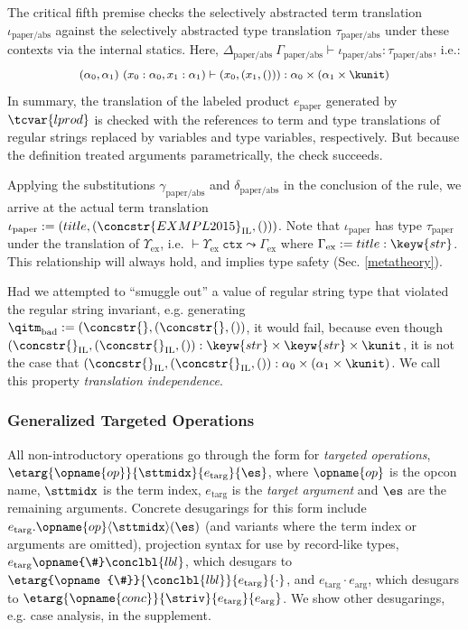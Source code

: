 The critical fifth premise checks the selectively abstracted term translation $\iota_\text{paper/abs}$ against the selectively abstracted type translation $\tau_\text{paper/abs}$ under these contexts via the internal statics. Here, $\Delta_\text{paper/abs}~\Gamma_\text{paper/abs} \vdash \iota_\text{paper/abs} : \tau_\text{paper/abs}$, i.e.: 
\[\small\begin{array}{l}(\alpha_0, \alpha_1)~(x_0 : \alpha_0, x_1 : \alpha_1) \vdash (x_0, (x_1, ())) : \alpha_0 \times (\alpha_1 \times \kunit)\end{array}\]
In summary, the translation of the labeled product $e_\text{paper}$ generated by $\tcvar{lprod}$ is checked with the references to term and type translations of regular strings replaced by variables and type variables, respectively. But because the  definition treated arguments parametrically, the check succeeds. %

Applying the substitutions $\gamma_\text{paper/abs}$ and $\delta_\text{paper/abs}$ in the conclusion of the rule, we arrive at the actual term translation $\iota_\text{paper} := (title, (\concstr{EXMPL 2015}_\text{IL}, ()))$. Note that $\iota_\text{paper}$ has type $\tau_\text{paper}$ under the translation of $\Upsilon_\text{ex}$, i.e. $\vdash \Upsilon_\text{ex}~\mathtt{ctx} \leadsto \Gamma_\text{ex}$ where $\Gamma_\text{ex} := title : \keyw{str}$. This relationship will always hold, and implies type safety (Sec. \ref{metatheory}). 

Had we attempted to ``smuggle out'' a value of regular string type that violated the regular string invariant, e.g. generating $\qitm_\text{bad} := (\concstr{}, (\concstr{}, ())$, it would fail, because even though $(\concstr{}_\text{IL}, (\concstr{}_\text{IL}, ()) : \keyw{str} \times \keyw{str} \times \kunit$, it is not the case that $(\concstr{}_\text{IL}, (\concstr{}_\text{IL}, ()) : \alpha_0 \times (\alpha_1 \times \kunit)$. We call this property \emph{translation independence}.


\subsubsection{Generalized Targeted Operations} \label{sec:targops}
\noindent All non-introductory operations go through the form for \emph{targeted operations}, $\etarg{\opname{op}}{\sttmidx}{e_\text{targ}}{\es}$, where $\opname{op}$ is the opcon name, ${\sttmidx}$ is the term index, $e_\text{targ}$ is the \emph{target argument} and $\es$ are the remaining arguments. Concrete desugarings for this form include $e_\text{targ}.\opname{op}\langle\sttmidx\rangle(\es)$ (and variants where the term index or arguments are omitted), projection syntax for use by record-like types, $e_\text{targ}\opname{\#}\conclbl{lbl}$, which desugars to $\etarg{\opname{\#}}{\conclbl{lbl}}{e_\text{targ}}{\cdot}$, and $e_\text{targ} \cdot e_\text{arg}$, which desugars to $\etarg{\opname{conc}}{\striv}{e_\text{targ}}{e_\text{arg}}$. We show other desugarings, e.g. case analysis, in the supplement.


